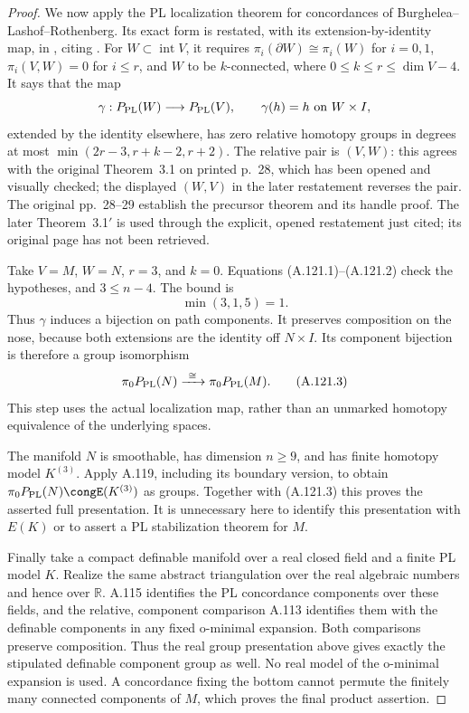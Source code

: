 \begin{proof}
We now apply the PL localization theorem for concordances of
Burghelea--Lashof--Rothenberg. Its exact form is restated, with its
extension-by-identity map, in
\cite[Theorem~3.3, p.~17]{GalvinNonino2025}, citing
\cite[Theorem~3.1$'$]{BurgheleaLashofRothenberg1975}.
For $W\subset\operatorname{int}V$, it requires
$\pi_i(\partial W)\cong\pi_i(W)$ for $i=0,1$,
$\pi_i(V,W)=0$ for $i\leq r$, and $W$ to be $k$-connected,
where $0\leq k\leq r\leq\dim V-4$. It says that the map
\[
       \gamma:P_{\rm PL}(W)\longrightarrow P_{\rm PL}(V),
       \qquad \gamma(h)=h\text{ on }W\times I,
\]
extended by the identity elsewhere, has zero relative homotopy
groups in degrees at most
$\min(2r-3,r+k-2,r+2)$.
The relative pair is $(V,W)$: this agrees with the original
Theorem~3.1 on printed p.~28, which has been opened and visually
checked; the displayed $(W,V)$ in the later restatement reverses
the pair. The original pp.~28--29 establish the precursor theorem
and its handle proof. The later Theorem~3.1$'$ is used through the
explicit, opened restatement just cited; its original page has not
been retrieved.

Take $V=M$, $W=N$, $r=3$, and $k=0$. Equations
(A.121.1)--(A.121.2) check the hypotheses, and $3\leq n-4$.
The bound is
\[
                   \min(3,1,5)=1.
\]
Thus $\gamma$ induces a bijection on path components.
It preserves composition on the nose, because both extensions are
the identity off $N\times I$. Its component bijection is therefore
a group isomorphism
\[
          \pi_0P_{\rm PL}(N)\xrightarrow{\ \cong\ }
          \pi_0P_{\rm PL}(M).                          \tag{A.121.3}
\]
This step uses the actual localization map, rather than an unmarked
homotopy equivalence of the underlying spaces.

The manifold $N$ is smoothable, has dimension $n\geq9$, and has
finite homotopy model $K^{(3)}$. Apply A.119, including its boundary
version, to obtain
$\pi_0P_{\rm PL}(N)\congE(K^{(3)})$ as groups.
Together with (A.121.3) this proves the asserted full presentation.
It is unnecessary here to identify this presentation with
$E(K)$ or to assert a PL stabilization theorem for $M$.

Finally take a compact definable manifold over a real closed field
and a finite PL model $K$. Realize the same abstract triangulation
over the real algebraic numbers and hence over $\mathbb R$.
A.115 identifies the PL concordance components over these fields,
and the relative, component comparison A.113 identifies them with
the definable components in any fixed o-minimal expansion. Both
comparisons preserve composition. Thus the real group presentation
above gives exactly the stipulated definable component group as
well. No real model of the o-minimal expansion is used. A concordance
fixing the bottom cannot permute the finitely many connected
components of $M$, which proves the final product assertion.
\end{proof}
